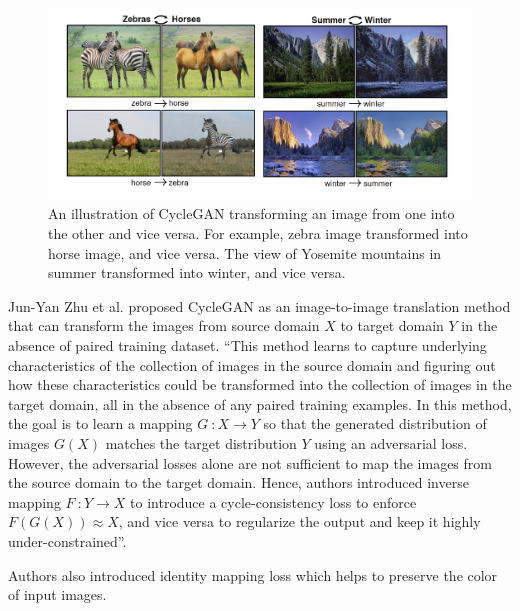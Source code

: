 \begin{figure}[H]
        \begin{center}
 	    \includegraphics[scale=0.35]{images/relatedWorks/CycleGANExamples.png}
	    \caption[An illustration of \ac{CycleGAN} transforming an image from one into the other and vice versa.]{An illustration of \ac{CycleGAN} transforming an image from one into the other and vice versa. For example, zebra image transformed into horse image, and vice versa. The view of Yosemite mountains in summer transformed into winter, and vice versa\cite{zhu2020unpaired}.}
	    \label{fig:CycleganExamples}
	    \end{center}
\end{figure}



Jun-Yan Zhu et al.\cite{zhu2020unpaired} proposed \ac{CycleGAN} as an image-to-image translation method that can transform the images from source domain $X$ to target domain $Y$ in the absence of paired training dataset. ``This method learns to capture underlying characteristics of the collection of images in the source domain and figuring out how these characteristics could be transformed into the collection of images in the target domain, all in the absence of any paired training examples. In this method, the goal is to learn a mapping $G\ \colon X \rightarrow Y$ so that the generated distribution of images $G(X)$ matches the target distribution $Y$ using an adversarial loss. However, the adversarial losses alone are not sufficient to map the images from the source domain to the target domain. Hence, authors introduced inverse mapping $F\ \colon Y \rightarrow X$ to introduce a cycle-consistency loss to enforce $F(G(X))\approx X$, and vice versa to regularize the output and keep it highly under-constrained''\cite{zhu2020unpaired}. 


Authors also introduced identity mapping loss which helps to preserve the color of input images. 




